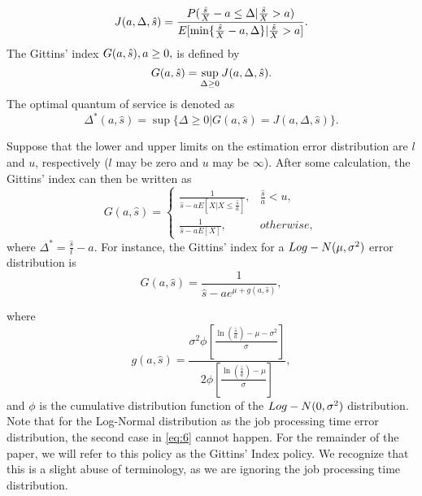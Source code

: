 \begin{equation} \label{eq:2} J(a,\Delta,\hat{s} ) = \frac{{P(\frac{{\hat s}}{X} - a \le \Delta |\frac{{\hat s}}{X} >
a)}}{{E[\min \{ \frac{{\hat s}}{X} - a,{\rm{ }}\Delta \} |\frac{{\hat s}}{X} >
a]}}.
\end{equation}
The Gittins' index $G(a,\hat{s}),{\rm{ }}a \ge 0,$ is defined by 
\begin{equation*}\label{eq:3}
G(a,\hat{s}) = \mathop {\sup
}\limits_{\Delta  \ge 0} {\rm{ }}J(a,\Delta,\hat{s} ).
\end{equation*}
The optimal quantum of service is
denoted as 
\begin{equation*}\label{eq:4}
{\Delta ^*}(a,\hat{s}) = \sup \{ \Delta  \ge 0|G(a,\hat{s}) = J(a,\Delta ,\hat{s} )\}.
\end{equation*}

Suppose that the lower and upper limits on the estimation error distribution are $l$ and $u$, respectively ($l$ may be zero and $u$ may be $\infty$). After some calculation, the Gittins' index can then be written as
\begin{equation}\label{eq:6}
G(a,\hat{s}) = 
\begin{cases}

\frac{1}{{\hat s - aE[X|X \le \frac{{\hat s}}{a}]}}, & \frac{{\hat s}}{a} < u,\\ 
\frac{1}{{\hat s - aE[X]}},& otherwise,
\end{cases}
\end{equation}
\noindent where ${\Delta ^*}  = \frac{{\hat s}}{l} - a$. For instance, the Gittins' index for a $Log - N(\mu,{\rm{
}}{\sigma ^2})$ error distribution is
\begin {equation}\label{eq:7}
G(a,\hat{s}) = \frac{1}{{\hat s - a{e^{\mu  + g(a,\hat{s})}}}}, \end{equation}

\noindent where 
\begin {equation*}\label{eq:12}
g(a,\hat{s})= \frac{{{\sigma ^2}\phi[ \frac{{\ln
(\frac{{\hat s}}{a}) - \mu  - {\sigma ^2}}}{\sigma }]}}{{{2}\phi [\frac{{\ln
(\frac{{\hat s}}{a}) - \mu }}{\sigma }]}},
\end{equation*}
\noindent and $\phi $ is the cumulative distribution function of the $Log - N(0,{\rm{
}}{\sigma ^2})$ distribution. Note that for the Log-Normal distribution as the job processing time error distribution, the second case in \eqref{eq:6} cannot happen. For the remainder of the paper, we will refer to this policy as the Gittins' Index policy. We recognize that this is a slight abuse of terminology, as we are ignoring the job processing time distribution.


